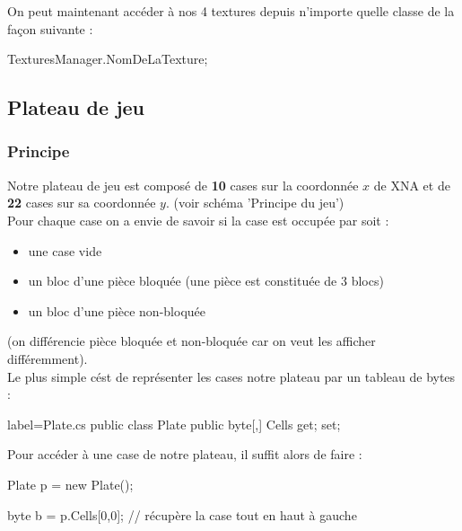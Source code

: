 \documentclass[a4paper]{article}
\begin{document}
\vspace{0.2cm}
On peut maintenant accéder à nos 4 textures depuis n'importe quelle classe de
la façon suivante : \\

\begin{csharpcode}
TexturesManager.NomDeLaTexture;
\end{csharpcode}

\subsection{Plateau de jeu}

\subsubsection{Principe}

Notre plateau de jeu est composé de \textbf{10} cases sur la coordonnée $x$ de
XNA et de \textbf{22} cases sur sa coordonnée $y$. (voir schéma 'Principe du jeu')\\
Pour chaque case on a envie de savoir si la case est occupée par soit :

\begin{itemize}
    \item une case vide
    \item un bloc d'une pièce bloquée (une pièce est constituée de 3 blocs)
    \item un bloc d'une pièce non-bloquée
\end{itemize}

(on différencie pièce bloquée et non-bloquée car on veut les afficher
différemment). \\

Le plus simple cést de représenter les cases notre plateau par un tableau de
bytes : \\

\begin{csharpcode*}{label=Plate.cs}
public class Plate
{
    public byte[,] Cells { get; set; }
}
\end{csharpcode*}

\vspace{0.2cm}

Pour accéder à une case de notre plateau, il suffit alors de faire : \\

\begin{csharpcode}
Plate p = new Plate();

byte b = p.Cells[0,0]; // récupère la case tout en haut à gauche
\end{csharpcode}
\end{document}
